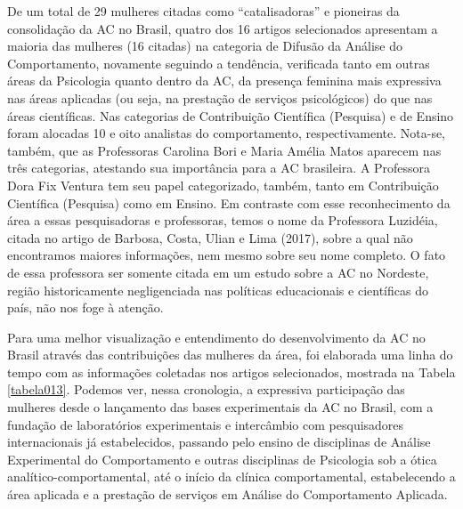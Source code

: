 De um total de 29 mulheres citadas como ``catalisadoras'' e pioneiras da consolidação da AC no Brasil, quatro dos 16 artigos selecionados apresentam a maioria das mulheres (16 citadas) na categoria de Difusão da Análise do Comportamento, novamente seguindo a tendência, verificada tanto em outras áreas da Psicologia quanto dentro da AC, da presença feminina mais expressiva nas áreas aplicadas (ou seja, na prestação de serviços psicológicos) do que nas áreas científicas. Nas categorias de Contribuição Científica (Pesquisa) e de Ensino foram alocadas 10 e oito analistas do comportamento, respectivamente. Nota-se, também, que as Professoras Carolina Bori e Maria Amélia Matos aparecem nas três categorias, atestando sua importância para a AC brasileira. A Professora Dora Fix Ventura tem seu papel categorizado, também, tanto em Contribuição Científica (Pesquisa) como em Ensino. Em contraste com esse reconhecimento da área a essas pesquisadoras e professoras, temos o nome da Professora Luzidéia, citada no artigo de Barbosa, Costa, Ulian e Lima (2017), sobre a qual não encontramos maiores informações, nem mesmo sobre seu nome completo. O fato de essa professora ser somente citada em um estudo sobre a AC no Nordeste, região historicamente negligenciada nas políticas educacionais e científicas do país, não nos foge à atenção.

Para uma melhor visualização e entendimento do desenvolvimento da AC no Brasil através das contribuições das mulheres da área, foi elaborada uma linha do tempo com as informações coletadas nos artigos selecionados, mostrada na Tabela \ref{tabela013}. Podemos ver, nessa cronologia, a expressiva participação das mulheres desde o lançamento das bases experimentais da AC no Brasil, com a fundação de laboratórios experimentais e intercâmbio com pesquisadores internacionais já estabelecidos, passando pelo ensino de disciplinas de Análise Experimental do Comportamento e outras disciplinas de Psicologia sob a ótica analítico-comportamental, até o início da clínica comportamental, estabelecendo a área aplicada e a prestação de serviços em Análise do Comportamento Aplicada.
\vfill
\pagebreak

